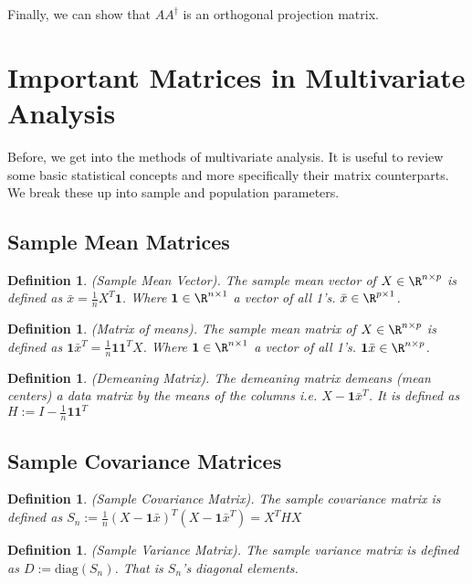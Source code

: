 \documentclass[twoside]{article}
\newcommand\diag[1]{\text{diag}(#1)}
\newtheorem{definition}[theorem]{Definition}
\begin{document}
Finally, we can show that $AA^\dagger$ is an orthogonal projection matrix.

\section{Important Matrices in Multivariate Analysis}

Before, we get into the methods of multivariate analysis. It is useful to review some basic statistical concepts and more specifically their matrix counterparts. We break these up into sample and population parameters.

\subsection{Sample Mean Matrices} 

\begin{definition}(Sample Mean Vector). 
The sample mean vector  of $X \in \R^{n\times p}$ is defined as $\bar{x} = \frac{1}{n}X^T\textbf{1}$. Where $\textbf{1}\in\R^{n\times 1}$ a vector of all 1's. $\bar{x} \in \R^{p\times 1}$.
\end{definition}

\begin{definition}(Matrix of means). 
The sample mean matrix  of $X \in \R^{n\times p}$ is defined as $\textbf{1}\bar{x}^T = \frac{1}{n}\textbf{1}\textbf{1}^TX$. Where $\textbf{1}\in\R^{n\times 1}$ a vector of all 1's. $\textbf{1}\bar{x} \in \R^{n\times p}$.
\end{definition}

\begin{definition}(Demeaning Matrix). 
The demeaning matrix demeans (mean centers) a data matrix by the means of the columns i.e. $X - \textbf{1}\bar{x}^T$. It is defined as $H := I - \frac{1}{n}\textbf{1}\textbf{1}^T$
\end{definition}

\subsection{Sample Covariance Matrices} 

\begin{definition}(Sample Covariance Matrix). 
The sample covariance matrix is defined as $S_n := \frac{1}{n}(X-\textbf{1}\bar{x})^T(X-\textbf{1}\bar{x}^T) = X^THX$
\end{definition}

\begin{definition}(Sample Variance Matrix). 
The sample variance matrix is defined as $D := \diag{S_n}$. That is $S_n$'s diagonal elements.
\end{definition}
\end{document}
